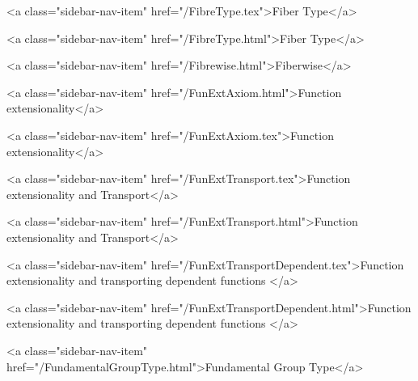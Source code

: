       
    
      
        
          <a class="sidebar-nav-item" href="/FibreType.tex">Fiber Type</a>
        
      
    
      
        
          <a class="sidebar-nav-item" href="/FibreType.html">Fiber Type</a>
        
      
    
      
        
          <a class="sidebar-nav-item" href="/Fibrewise.html">Fiberwise</a>
        
      
    
      
        
          <a class="sidebar-nav-item" href="/FunExtAxiom.html">Function extensionality</a>
        
      
    
      
        
          <a class="sidebar-nav-item" href="/FunExtAxiom.tex">Function extensionality</a>
        
      
    
      
        
          <a class="sidebar-nav-item" href="/FunExtTransport.tex">Function extensionality and Transport</a>
        
      
    
      
        
          <a class="sidebar-nav-item" href="/FunExtTransport.html">Function extensionality and Transport</a>
        
      
    
      
        
          <a class="sidebar-nav-item" href="/FunExtTransportDependent.tex">Function extensionality and transporting dependent functions </a>
        
      
    
      
        
          <a class="sidebar-nav-item" href="/FunExtTransportDependent.html">Function extensionality and transporting dependent functions </a>
        
      
    
      
        
          <a class="sidebar-nav-item" href="/FundamentalGroupType.html">Fundamental Group Type</a>
        
      
    
